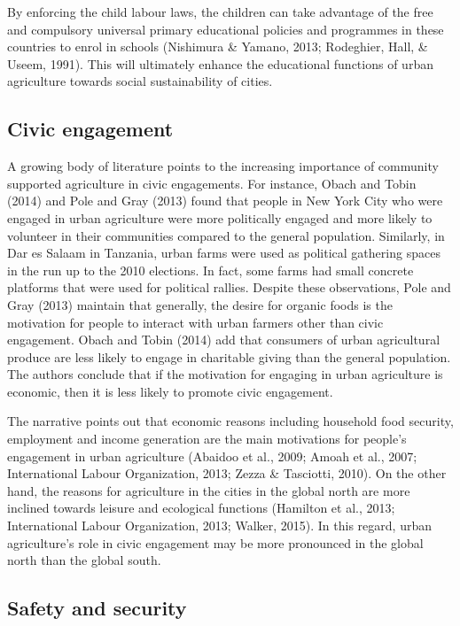 By enforcing the child labour laws, the children can take advantage of the free and compulsory universal primary educational policies and programmes in these countries to enrol in schools (Nishimura \& Yamano, 2013; Rodeghier, Hall, \& Useem, 1991). This will ultimately enhance the educational functions of urban agriculture towards social sustainability of cities.

\subsection{Civic engagement}

A growing body of literature points to the increasing importance of community supported agriculture in civic engagements. For instance, Obach and Tobin (2014) and Pole and Gray (2013) found that people in New York City who were engaged in urban agriculture were more politically engaged and more likely to volunteer in their communities compared to the general population. Similarly, in Dar es Salaam in Tanzania, urban farms were used as political gathering spaces in the run up to the 2010 elections. In fact, some farms had small concrete platforms that were used for political rallies. Despite these observations, Pole and Gray (2013) maintain that generally, the desire for organic foods is the motivation for people to interact with urban farmers other than civic engagement. Obach and Tobin (2014) add that consumers of urban agricultural produce are less likely to engage in charitable giving than the general population. The authors conclude that if the motivation for engaging in urban agriculture is economic, then it is less likely to promote civic engagement.

The narrative points out that economic reasons including household food security, employment and income generation are the main motivations for people's engagement in urban agriculture \cite{Amponsah2016a, Kodjo2014} (Abaidoo et al., 2009; Amoah et al., 2007; International Labour Organization, 2013; Zezza \& Tasciotti, 2010). On the other hand, the reasons for agriculture in the cities in the global north are more inclined towards leisure and ecological functions (Hamilton et al., 2013; International Labour Organization, 2013; Walker, 2015). In this regard, urban agriculture's role in civic engagement may be more pronounced in the global north than the global south.

\subsection{Safety and security}

